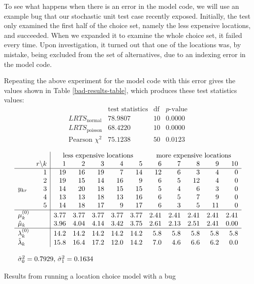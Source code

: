 \documentclass{sig-alternate}
\begin{document}
To see what happens when there is an error in the model code, we will use an
example bug that our stochastic unit test case recently exposed.
Initially, the test only
examined the first half of the choice set, namely the less expensive locations,
and succeeded.  When we expanded it to examine the whole choice set, it failed
every time.  Upon investigation, it turned out that one of the locations was,
by mistake, being excluded from the set of alternatives, due to an indexing
error in the model code.

Repeating the above experiment for the model code with this error gives the
values shown in Table \ref{bad-results-table}, which produces these test
statistics values:
\[
\begin{array}{l|rrr}
& \text{test statistics} &\text{df} & p\text{-value} \\\hline
LRTS_{\text{normal}} & 78.9807 & 10 & 0.0000 \\
LRTS_{\text{poisson}} & 68.4220 & 10 & 0.0000 \\
\text{Pearson } \chi^2 & 75.1238 & 50 & 0.0123
\end{array}
\]

\begin{table}[t]
\[
\begin{array}{lr|rrrrrrrrrr}
&& \multicolumn{5}{c}{\text{less expensive locations}} & \multicolumn{5}{c}{\text{more expensive
      locations}} \\
& r \backslash k& 1 & 2 & 3 & 4 & 5 & 6 & 7 & 8 & 9 & 10 \\\hline
& 1 &19 & 16 & 19 & 7 & 14& 12 & 6 & 3 & 4 & 0\\
& 2 &19 &15& 14 &16 & 9 & 6 & 5 & 12 & 4 & 0\\
y_{kr} & 3 &14 &20 &18 &15 &15 & 5 & 4 & 6 & 3 & 0\\
& 4 &13 &13 &18 &13 &16 & 6 & 5 & 7 & 9 & 0\\
& 5 &14 &18 &17 & 9 &17 & 6 & 3 & 5 &11 & 0\\\hline
\mu_{k}^{(0)} & & 3.77 & 3.77 & 3.77 & 3.77 & 3.77 & 2.41 & 2.41 &2.41
      &2.41 & 2.41\\
\hat{\mu}_{k} & & 3.96 &  4.04 &  4.14 &  3.42 &  3.75 &
  2.61 &  2.13 &   2.51 & 2.41 &   0.00 \\\hline
\lambda_{k}^{(0)} & & 14.2  & 14.2 & 14.2 & 14.2 & 14.2
& 5.8 &  5.8 &  5.8 &  5.8 &  5.8\\
\hat{\lambda}_{k} & & 15.8 &  16.4 &  17.2 &  12.0 & 14.2 &   7.0 &
   4.6 &    6.6 &    6.2 &   0.0 \\
\\
\multicolumn{12}{l}{\hat{\sigma}_0^2 = 0.7929$, $\hat{\sigma}_1^2 = 0.1634}
\end{array}
\]
\caption{Results from running a location choice model with a bug}
\label{bad-results-table}
\end{table}
\end{document}
